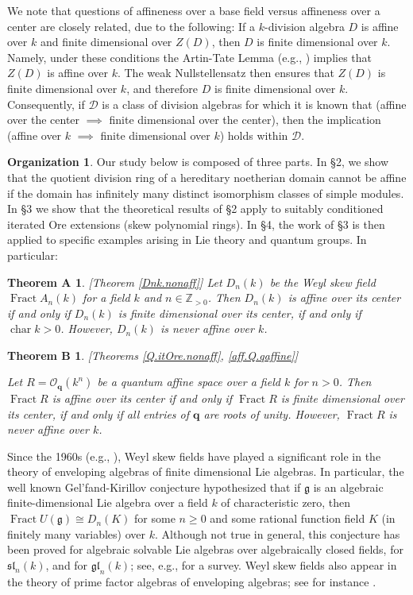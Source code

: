 \documentclass{conm-p-l}
\newtheorem*{thmA*}{Theorem A}
\newtheorem*{thmB*}{Theorem B}
\theoremstyle{definition}
\newtheorem{organization}[theorem]{Organization}
\theoremstyle{remark}
\numberwithin{equation}{section}
\newcommand{\ZZ}{\mathbb{Z}}
\newcommand \calO {{\mathcal{O}}}
\newcommand\gfrak{\mathfrak{g}}
\newcommand\bfq{\boldsymbol{q}}
\DeclareMathOperator \Fract { {\mathrm{Fract}} }
\DeclareMathOperator{\ch}{char}
\newcommand \Zpos {\ZZ_{> 0}}
\newcommand\Obfq{\calO_{\bfq}}
\begin{document}
We note that questions of affineness over a base field versus affineness over a center are closely related, due to the following: If a $k$-division algebra $D$ is affine over $k$ and finite dimensional over $Z(D)$, then $D$ is finite dimensional over $k$.  Namely, under these conditions the Artin-Tate Lemma (e.g., \cite[Lemma 13.9.10]{McC-Rob}) implies that $Z(D)$ is affine over $k$. The weak Nullstellensatz then ensures that $Z(D)$ is finite dimensional over $k$, and therefore $D$ is finite dimensional over $k$.  Consequently, if $\mathcal D$ is a class of division algebras for which it is known that (affine over the center $\implies$ finite dimensional over the center), then the implication (affine over $k$ $\implies$ finite dimensional over $k$) holds within $\mathcal D$.

\begin{organization}
Our study below is composed of three parts. In \S 2, we show that the quotient division ring of a hereditary noetherian domain cannot be affine if the domain has infinitely many distinct isomorphism classes of simple modules. In \S3 we show that the theoretical results of \S2 apply to suitably conditioned iterated Ore extensions (skew polynomial rings). In \S 4, the work of \S 3 is then applied to specific examples arising in Lie theory and quantum groups.  In particular:

\begin{thmA*} {\rm[Theorem \ref{Dnk.nonaff}]}
Let $D_n(k)$ be the Weyl skew field $\Fract A_n(k)$ for a field $k$ and $n\in\Zpos$.  Then $D_n(k)$ is affine over its center if and only if $D_n(k)$ is finite dimensional over its center, if and only if $\ch k > 0$.  However, $D_n(k)$ is never affine over $k$.
\end{thmA*}

\begin{thmB*} {\rm[Theorems \ref{Q.itOre.nonaff},  \ref{aff.Q.qaffine}]}

Let $R = \Obfq(k^n)$ be a quantum affine space over a field $k$ for $n > 0$.  Then $\Fract R$ is affine over its center if and only if $\Fract R$ is finite dimensional over its center, if and only if all entries of $\bfq$ are roots of unity.  However, $\Fract R$ is never affine over $k$.
\end{thmB*}

Since the 1960s (e.g., \cite{Gel-Kir}), Weyl skew fields have played a significant role in the theory of enveloping algebras of finite dimensional Lie algebras. In particular, the well known Gel'fand-Kirillov conjecture hypothesized that if $\gfrak$ is an algebraic finite-dimensional Lie algebra over a field $k$ of characteristic zero, then $\Fract U(\gfrak) \cong D_n(K)$ for some $n\ge0$ and some rational function field $K$ (in finitely many variables) over $k$.  Although not true in general, this conjecture has been proved for algebraic solvable Lie algebras over algebraically closed fields, for $\mathfrak{sl}_n(k)$, and for $\mathfrak{gl}_n(k)$; see, e.g., \cite{Ale-O-VdB} for a survey. Weyl skew fields also appear in the theory of prime factor algebras of enveloping algebras; see for instance \cite[Chapter 14]{McC-Rob}.


\end{organization}
\end{document}
